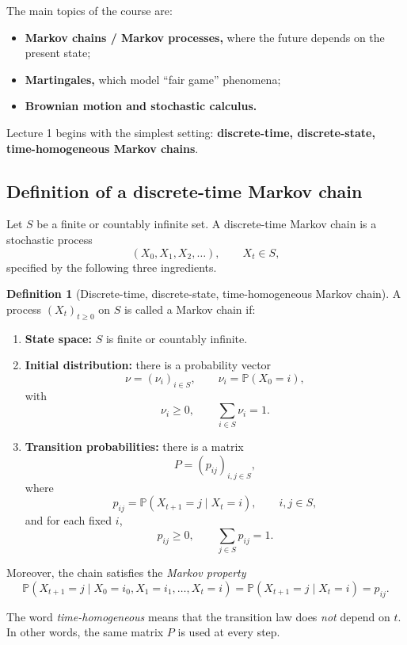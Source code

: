 \documentclass[11pt]{article}
\theoremstyle{definition}
\newtheorem{definition}[theorem]{Definition}
\begin{document}
The main topics of the course are:
\begin{itemize}[leftmargin=2em]
    \item \textbf{Markov chains / Markov processes,} where the future depends on the present state;
    \item \textbf{Martingales,} which model ``fair game'' phenomena;
    \item \textbf{Brownian motion and stochastic calculus.}
\end{itemize}

Lecture 1 begins with the simplest setting: \textbf{discrete-time, discrete-state, time-homogeneous Markov chains}.

\subsection{Definition of a discrete-time Markov chain}

Let \(S\) be a finite or countably infinite set. A discrete-time Markov chain is a stochastic process
\[
(X_0,X_1,X_2,\dots), \qquad X_t\in S,
\]
specified by the following three ingredients.

\begin{definition}[Discrete-time, discrete-state, time-homogeneous Markov chain]
A process \((X_t)_{t\ge 0}\) on \(S\) is called a Markov chain if:
\begin{enumerate}[label=(\roman*)]
    \item \textbf{State space:} \(S\) is finite or countably infinite.
    
    \item \textbf{Initial distribution:} there is a probability vector
    \[
    \nu=(\nu_i)_{i\in S},
    \qquad
    \nu_i=\mathbb P(X_0=i),
    \]
    with
    \[
    \nu_i\ge 0,
    \qquad
    \sum_{i\in S}\nu_i=1.
    \]
    
    \item \textbf{Transition probabilities:} there is a matrix
    \[
    P=(p_{ij})_{i,j\in S},
    \]
    where
    \[
    p_{ij}=\mathbb P(X_{t+1}=j\mid X_t=i),
    \qquad i,j\in S,
    \]
    and for each fixed \(i\),
    \[
    p_{ij}\ge 0,
    \qquad
    \sum_{j\in S} p_{ij}=1.
    \]
\end{enumerate}
Moreover, the chain satisfies the \emph{Markov property}
\[
\mathbb P(X_{t+1}=j\mid X_0=i_0,X_1=i_1,\dots,X_t=i)
=
\mathbb P(X_{t+1}=j\mid X_t=i)
=
p_{ij}.
\]
\end{definition}

The word \emph{time-homogeneous} means that the transition law does \emph{not} depend on \(t\). In other words, the same matrix \(P\) is used at every step.
\end{document}
